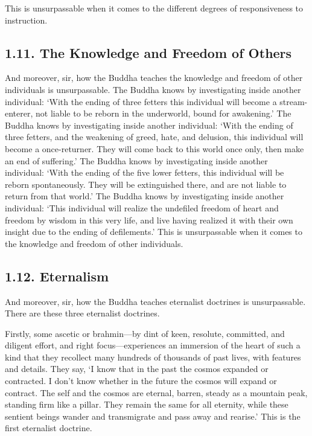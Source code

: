 \documentclass[12pt,openany]{book}%
\begin{document}
This is unsurpassable when it comes to the different degrees of responsiveness to instruction. 

\subsection*{1.11. The Knowledge and Freedom of Others }

And moreover, sir, how the Buddha teaches the knowledge and freedom of other individuals is unsurpassable. The Buddha knows by investigating inside another individual: ‘With the ending of three fetters this individual will become a stream-enterer, not liable to be reborn in the underworld, bound for awakening.’ The Buddha knows by investigating inside another individual: ‘With the ending of three fetters, and the weakening of greed, hate, and delusion, this individual will become a once-returner. They will come back to this world once only, then make an end of suffering.’ The Buddha knows by investigating inside another individual: ‘With the ending of the five lower fetters, this individual will be reborn spontaneously. They will be extinguished there, and are not liable to return from that world.’ The Buddha knows by investigating inside another individual: ‘This individual will realize the undefiled freedom of heart and freedom by wisdom in this very life, and live having realized it with their own insight due to the ending of defilements.’ This is unsurpassable when it comes to the knowledge and freedom of other individuals. 

\subsection*{1.12. Eternalism }

And moreover, sir, how the Buddha teaches eternalist doctrines is unsurpassable. There are these three eternalist doctrines. 

Firstly, some ascetic or brahmin—by dint of keen, resolute, committed, and diligent effort, and right focus—experiences an immersion of the heart of such a kind that they recollect many hundreds of thousands of past lives, with features and details. They say, ‘I know that in the past the cosmos expanded or contracted. I don’t know whether in the future the cosmos will expand or contract. The self and the cosmos are eternal, barren, steady as a mountain peak, standing firm like a pillar. They remain the same for all eternity, while these sentient beings wander and transmigrate and pass away and rearise.’ This is the first eternalist doctrine. 
\end{document}
